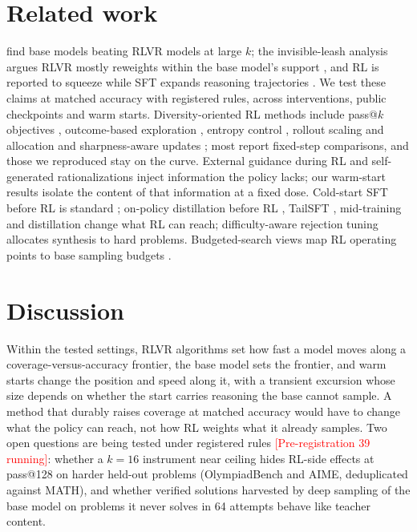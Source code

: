 \documentclass{article}
\theoremstyle{plain}
\newcommand{\pending}[1]{\textcolor{red}{[#1]}}
\begin{document}
\section{Related work}\label{sec:related}
\citet{yue2025limit} find base models beating RLVR models at large $k$; the invisible-leash analysis argues RLVR
mostly reweights within the base model's support \citep{wu2025leash}, and RL is reported to squeeze while SFT expands
reasoning trajectories \citep{matsutani2025squeeze}. We test these claims at matched accuracy with registered rules,
across interventions, public checkpoints and warm starts. Diversity-oriented RL methods include pass@$k$ objectives
\citep{walder2025pkpo,chen2025passktraining}, outcome-based exploration \citep{song2025outcome}, entropy control
\citep{cui2025entropy}, rollout scaling and allocation \citep{hu2025brorl,yang2025depth,knapsack2025,yu2026datpo} and
sharpness-aware updates \citep{kim2026flat}; most report fixed-step comparisons, and those we reproduced stay on the
curve. External guidance during RL \citep{yan2025guidance,ma2025relift,li2025questa,zhang2025bread,ding2026lspo} and
self-generated rationalizations \citep{zelikman2022star,zhou2025expo,mahdavi2026splice} inject information the policy
lacks; our warm-start results isolate the content of that information at a fixed dose. Cold-start SFT before RL is
standard \citep{guo2025r1}; on-policy distillation before RL \citep{dong2026opd}, TailSFT \citep{malladi2026tailsft},
mid-training \citep{wang2025octothinker,zhang2025interplay} and distillation \citep{kim2025rlvsdistill} change what RL
can reach; difficulty-aware rejection tuning \citep{tong2024dart} allocates synthesis to hard problems. Budgeted-search
views map RL operating points to base sampling budgets \citep{sun2026boptr}.

\section{Discussion}\label{sec:discussion}
Within the tested settings, RLVR algorithms set how fast a model moves along a coverage-versus-accuracy frontier, the
base model sets the frontier, and warm starts change the position and speed along it, with a transient excursion
whose size depends on whether the start carries reasoning the base cannot sample. A method that durably raises
coverage at matched accuracy would have to change what the policy can reach, not how RL weights what it already
samples. Two open questions are being tested under registered rules \pending{Pre-registration 39 running}: whether a
$k=16$ instrument near ceiling hides RL-side effects at pass@128 on harder held-out problems (OlympiadBench and AIME,
deduplicated against MATH), and whether verified solutions harvested by deep sampling of the base model on problems
it never solves in 64 attempts behave like teacher content.
\end{document}
